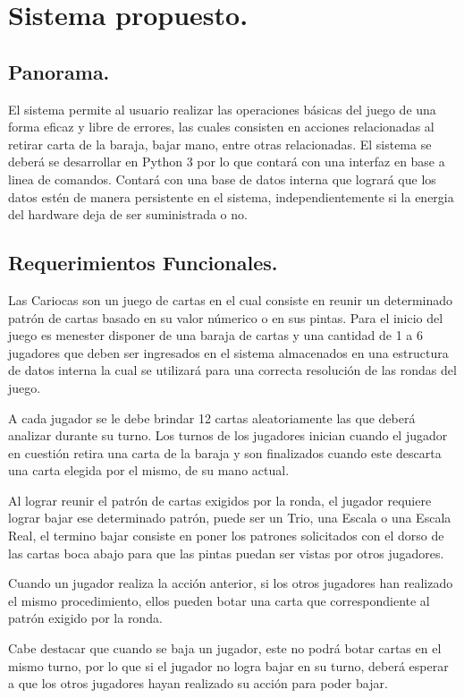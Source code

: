 \documentclass[60pt]{article}
\begin{document}
\section{Sistema propuesto.}\label{cap:sistema}
\subsection{Panorama.}\label{cap:panorama}
El sistema permite al usuario realizar las operaciones básicas del juego de una forma eficaz y libre de errores, las cuales consisten en acciones relacionadas al retirar carta de la baraja, bajar mano, entre otras relacionadas. El sistema se deberá se desarrollar en Python 3 por lo que contará con una interfaz en base a linea de comandos. Contará con una base de datos interna que logrará que los datos estén de manera persistente en el sistema, independientemente si la energia del hardware deja de ser suministrada o no.
\subsection{Requerimientos Funcionales.}\label{cap:requerimientos-funcionales}
Las Cariocas son un juego de cartas en el cual consiste en reunir un determinado patrón de cartas basado en su valor númerico o en sus pintas. Para el inicio del juego es menester disponer de una baraja de cartas y una cantidad de 1 a 6 jugadores que deben ser ingresados en el sistema almacenados en una estructura de datos interna la cual se utilizará para una correcta resolución de las rondas del juego. 

A cada jugador se le debe brindar 12 cartas aleatoriamente las que deberá analizar durante su turno. Los turnos de los jugadores inician cuando el jugador en cuestión retira una carta de la baraja y son finalizados cuando este descarta una carta elegida por el mismo, de su mano actual.

Al lograr reunir el patrón de cartas exigidos por la ronda, el jugador requiere lograr bajar ese determinado patrón, puede ser un Trio, una Escala o una Escala Real, el termino bajar consiste en poner los patrones solicitados con el dorso de las cartas boca abajo para que las pintas puedan ser vistas por otros jugadores.

Cuando un jugador realiza la acción anterior, si los otros jugadores han realizado el mismo procedimiento, ellos pueden botar una carta que correspondiente al patrón exigido por la ronda.

Cabe destacar que cuando se baja un jugador, este no podrá botar cartas en el mismo turno, por lo que si el jugador no logra bajar en su turno, deberá esperar a que los otros jugadores hayan realizado su acción para poder bajar.
\end{document}
